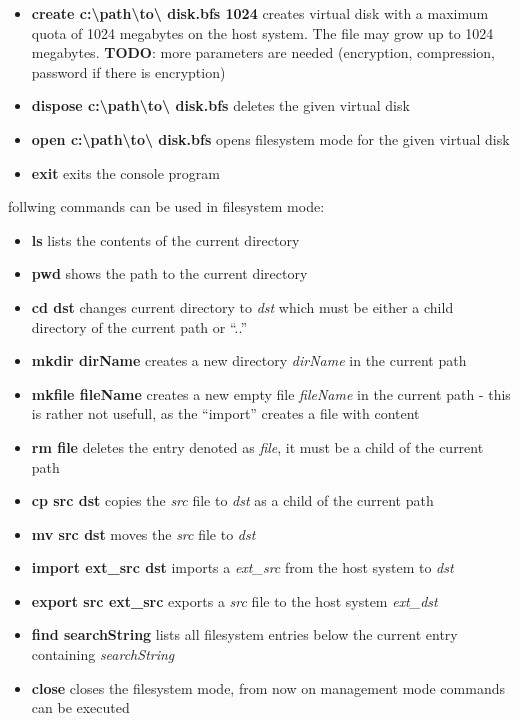 \begin{itemize}
  \item{\textbf{create c:\textbackslash path\textbackslash to\textbackslash
  disk.bfs 1024}} creates virtual disk with a maximum quota of 1024 megabytes on the host system. The file may grow up to 1024 megabytes.
  \textbf{TODO}: more parameters are needed (encryption, compression, password if there is encryption)
  \item {\textbf{dispose c:\textbackslash path\textbackslash to\textbackslash
  disk.bfs}} deletes the given virtual disk
  \item {\textbf{open c:\textbackslash path\textbackslash to\textbackslash
  disk.bfs}} opens filesystem mode for the given virtual disk
  \item {\textbf{exit}} exits the console program
\end{itemize}

follwing commands can be used in filesystem mode:

\begin{itemize}
  \item {\textbf{ls}} lists the contents of the current directory
  \item {\textbf{pwd}} shows the path to the current directory
  \item {\textbf{cd dst}} changes current directory to \textit{dst} which must
  be either a child directory of the current path or ``..''
  \item {\textbf{mkdir dirName}} creates a new directory \textit{dirName} in the
  current path
  \item {\textbf{mkfile fileName}} creates a new empty file \textit{fileName} in
  the current path - this is rather not usefull, as the ``import'' creates a
  file with content
  \item {\textbf{rm file}} deletes the entry denoted as \textit{file}, it must
  be a child of the current path
  \item {\textbf{cp src dst}} copies the \textit{src} file to \textit{dst} as a
  child of the current path
  \item {\textbf{mv src dst}} moves the \textit{src} file to \textit{dst}
  \item {\textbf{import ext\_src dst}} imports a \textit{ext\_src} from the
  host system to \textit{dst}
  \item {\textbf{export src ext\_src}} exports a \textit{src} file to the host
  system \textit{ext\_dst}
  \item {\textbf{find searchString}} lists all filesystem entries below the
  current entry containing \textit{searchString}
  \item {\textbf{close}} closes the filesystem mode, from now on management mode
  commands can be executed
\end{itemize}